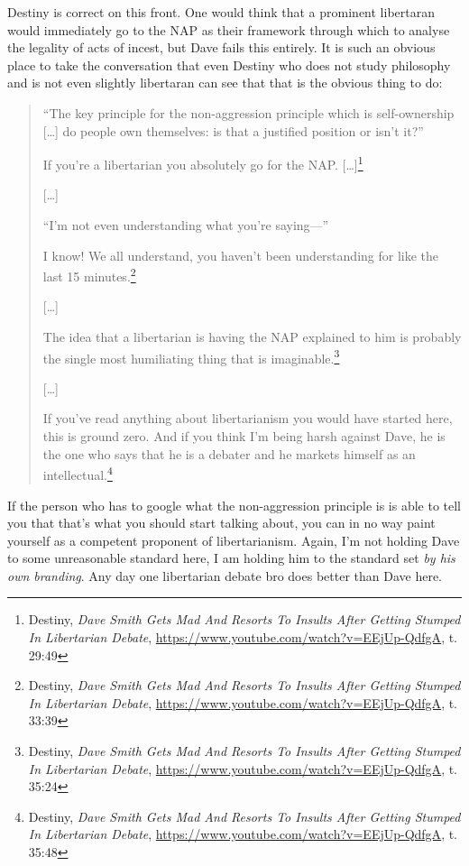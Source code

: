 \documentclass[11pt]{article}
\begin{document}
Destiny is correct on this front. One would think that a prominent libertaran would immediately go to the NAP as their framework through which to analyse the legality of acts of incest, but Dave fails this entirely. It is such an obvious place to take the conversation that even Destiny who does not study philosophy and is not even slightly libertaran can see that that is the obvious thing to do:
\begin{quote}
``The key principle for the non-aggression principle which is self-ownership [\ldots{}] do people own themselves: is that a justified position or isn't it?''

If you're a libertarian you absolutely go for the NAP. [\ldots{}]\footnote{Destiny, \emph{Dave Smith Gets Mad And Resorts To Insults After Getting Stumped In Libertarian Debate}, \url{https://www.youtube.com/watch?v=EEjUp-QdfgA}, t. 29:49}

{[}\ldots{}]

``I'm not even understanding what you're saying---''

I know! We all understand, you haven't been understanding for like the last 15 minutes.\footnote{Destiny, \emph{Dave Smith Gets Mad And Resorts To Insults After Getting Stumped In Libertarian Debate}, \url{https://www.youtube.com/watch?v=EEjUp-QdfgA}, t. 33:39}

{[}\ldots{}]

The idea that a libertarian is having the NAP explained to him is probably the single most humiliating thing that is imaginable.\footnote{Destiny, \emph{Dave Smith Gets Mad And Resorts To Insults After Getting Stumped In Libertarian Debate}, \url{https://www.youtube.com/watch?v=EEjUp-QdfgA}, t. 35:24}

{[}\ldots{}]

If you've read anything about libertarianism you would have started here, this is ground zero. And if you think I'm being harsh against Dave, he is the one who says that he is a debater and he markets himself as an intellectual.\footnote{Destiny, \emph{Dave Smith Gets Mad And Resorts To Insults After Getting Stumped In Libertarian Debate}, \url{https://www.youtube.com/watch?v=EEjUp-QdfgA}, t. 35:48}
\end{quote}

If the person who has to google what the non-aggression principle is is able to tell you that that's what you should start talking about, you can in no way paint yourself as a competent proponent of libertarianism. Again, I'm not holding Dave to some unreasonable standard here, I am holding him to the standard set \emph{by his own branding}. Any day one libertarian debate bro does better than Dave here.
\end{document}
